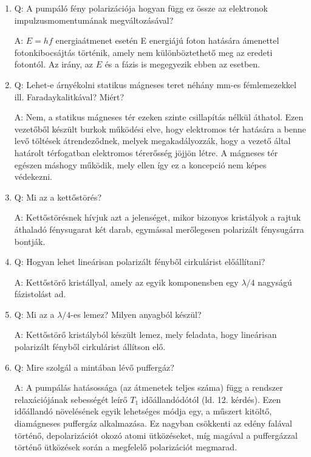 \begin{enumerate}
    \item Q: A pumpáló fény polarizációja hogyan függ ez össze az elektronok impulzusmomentumának megváltozásával?
    \begin{displayquote}
    	A: $E = hf$ energiaátmenet esetén E energiájú foton hatására ámenettel fotonkibocsájtás történik, amely nem különböztethető meg az eredeti fotontól. Az irány, az $E$ és a fázis is megegyezik ebben az esetben.
    \end{displayquote}
    
    \item Q: Lehet-e árnyékolni statikus mágneses teret néhány mm-es fémlemezekkel ill. Faradaykalitkával? Miért?
    \begin{displayquote}
    	A: Nem, a statikus mágneses tér ezeken szinte csillapítás nélkül áthatol. Ezen vezetőből készült burkok működési elve, hogy elektromos tér hatására a benne levő töltések átrendeződnek, melyek megakadályozzák, hogy a vezető által határolt térfogatban elektromos térerősség jöjjön létre. A mágneses tér egészen máshogy működik, mely ellen így ez a koncepció nem képes védekezni.
    \end{displayquote}
    
    \item Q: Mi az a kettőstörés?
    \begin{displayquote}
    	A: Kettőstörésnek hívjuk azt a jelenséget, mikor bizonyos kristályok a rajtuk áthaladó fénysugarat két darab, egymással merőlegesen polarizált fénysugárra bontják.
    \end{displayquote}
    
    \item Q: Hogyan lehet lineárisan polarizált fényből cirkulárist előállítani?
    \begin{displayquote}
    	A: Kettőstörő kristállyal, amely az egyik komponensben egy $\lambda/4$ nagyságú fázistolást ad.
    \end{displayquote}
    
    \item Q: Mi az a $\lambda/4$-es lemez? Milyen anyagból készül? 
    \begin{displayquote}
    	A: Kettőstörő kristályból készült lemez, mely feladata, hogy lineárisan polarizált fényből cirkulárist állítson elő.
    \end{displayquote}
    
    \item Q: Mire szolgál a mintában lévő puffergáz?
    \begin{displayquote}
    	A: A pumpálás hatásossága (az átmenetek teljes száma) függ a rendszer relaxációjának sebességét leírő $T_{1}$ időállandódótól (ld. 12. kérdés). Ezen időállandó növelésének egyik lehetséges módja egy, a műszert kitöltő, diamágneses puffergáz alkalmazása. Ez nagyban csökkenti az edény falával történő, depolarizációt okozó atomi ütközéseket, míg magával a puffergázzal történő ütközések során a megfelelő polarizációt megmarad.
    \end{displayquote}
    

\end{enumerate}

